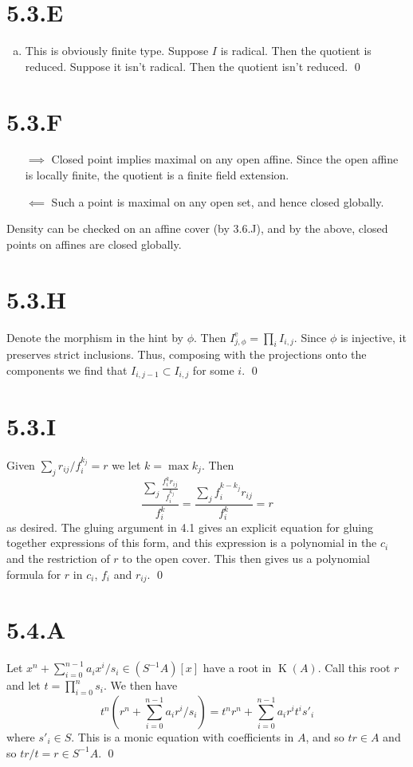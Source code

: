 \documentclass{article}
\begin{document}
\section{5.3.E}
\begin{enumerate}[a.]
    \item This is obviously finite type. Suppose $I$ is radical. Then
          the quotient is reduced. Suppose it isn't radical. Then the quotient isn't
          reduced. \qed
\end{enumerate}

\section{5.3.F}
\begin{enumerate}[a.]
    \item [$\implies$] Closed point implies maximal on any open affine. Since
          the open affine is locally finite, the quotient is a finite field extension.
    \item [$\impliedby$] Such a point is maximal on any open set, and hence
          closed globally.
\end{enumerate}
Density can be checked on an affine cover (by 3.6.J), and by the above, closed
points on affines are closed globally.

\section{5.3.H}
Denote the morphism in the hint by $\phi$. Then
$I_{j,\phi}^{\text{e}}=\prod_i I_{i,j}$. Since $\phi$ is injective, it
preserves strict inclusions. Thus, composing with the projections onto the
components we find that $I_{i,j-1} \subset I_{i,j}$ for some
$i$. \qed

\section{5.3.I}
Given $\sum_j r_{ij}/f_i^{k_j}=r$ we let $k=\max k_j$. Then
\[
    \frac{\sum_j \frac{f_i^kr_{ij}}{f_i^{k_j}}}{f_i^k}=\frac{\sum_j
    f_i^{k-k_j}r_{ij}}{f_i^k}=r
\] as desired. The gluing argument in 4.1 gives an
explicit equation for gluing together expressions of this form, and this
expression is a polynomial in the $c_i$ and the restriction
of $r$ to the open cover. This then gives us a polynomial
formula for $r$ in $c_i$,
$f_i$ and $r_{ij}$. \qed

\section{5.4.A}
Let $x^n+\sum_{i=0}^{n-1} a_ix^i/s_i \in (S^{-1}A)[x]$ have a root in $\operatorname{K}(A)$. Call this
root $r$ and let $t=\prod_{i=0}^n s_i$. We then have
\[
    t^n(r^n+\sum_{i=0}^{n-1} a_ir^i/s_i)=t^nr^n+\sum_{i=0}^{n-1}
    a_ir^it^is'_i
\] where $s'_i \in S$. This is a monic equation
with coefficients in $A$, and so $tr \in A$
and so $tr/t=r \in S^{-1}A$. \qed
\end{document}
